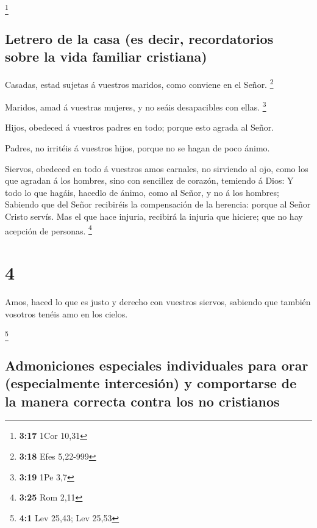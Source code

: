 \footnote{\textbf{3:17} 1Cor 10,31}

\hypertarget{letrero-de-la-casa-es-decir-recordatorios-sobre-la-vida-familiar-cristiana}{%
\subsection{Letrero de la casa (es decir, recordatorios sobre la vida
familiar
cristiana)}\label{letrero-de-la-casa-es-decir-recordatorios-sobre-la-vida-familiar-cristiana}}

 Casadas, estad sujetas á vuestros maridos, como conviene
en el Señor. \footnote{\textbf{3:18} Efes 5,22-999}

 Maridos, amad á vuestras mujeres, y no seáis desapacibles
con ellas. \footnote{\textbf{3:19} 1Pe 3,7}

 Hijos, obedeced á vuestros padres en todo; porque esto
agrada al Señor.

 Padres, no irritéis á vuestros hijos, porque no se hagan
de poco ánimo.

 Siervos, obedeced en todo á vuestros amos carnales, no
sirviendo al ojo, como los que agradan á los hombres, sino con sencillez
de corazón, temiendo á Dios:  Y todo lo que hagáis, hacedlo
de ánimo, como al Señor, y no á los hombres;  Sabiendo que
del Señor recibiréis la compensación de la herencia: porque al Señor
Cristo servís.  Mas el que hace injuria, recibirá la
injuria que hiciere; que no hay acepción de personas. \footnote{\textbf{3:25}
  Rom 2,11}

\hypertarget{section-3}{%
\section{4}\label{section-3}}

 Amos, haced lo que es justo y derecho con vuestros siervos,
sabiendo que también vosotros tenéis amo en los cielos.

\footnote{\textbf{4:1} Lev 25,43; Lev 25,53}

\hypertarget{admoniciones-especiales-individuales-para-orar-especialmente-intercesiuxf3n-y-comportarse-de-la-manera-correcta-contra-los-no-cristianos}{%
\subsection{Admoniciones especiales individuales para orar
(especialmente intercesión) y comportarse de la manera correcta contra
los no
cristianos}\label{admoniciones-especiales-individuales-para-orar-especialmente-intercesiuxf3n-y-comportarse-de-la-manera-correcta-contra-los-no-cristianos}}

